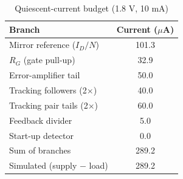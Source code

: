 \begin{table}[!t]
\centering
\caption{Quiescent-current budget (1.8 V, 10 mA)}
\label{tab:budget}
\footnotesize
\begin{tabular}{@{}lc@{}}
\toprule
Branch & Current ($\mu$A) \\
\midrule
Mirror reference ($I_D/N$) & 101.3 \\
$R_G$ (gate pull-up) & 32.9 \\
Error-amplifier tail & 50.0 \\
Tracking followers (2$\times$) & 40.0 \\
Tracking pair tails (2$\times$) & 60.0 \\
Feedback divider & 5.0 \\
Start-up detector & 0.0 \\
\midrule
Sum of branches & 289.2 \\
Simulated (supply $-$ load) & 289.2 \\
\bottomrule
\end{tabular}
\end{table}
